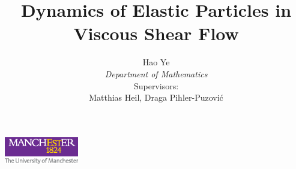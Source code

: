 \documentclass{beamer}
\title{\fontsize{14pt}{12pt}\selectfont Dynamics of Elastic Particles in Viscous Shear Flow}
\author{
	Hao Ye \\ \textit{Department of Mathematics} \\
	\vspace{0.5cm} 
	Supervisors: \\Matthias Heil, Draga Pihler-Puzović
}
\begin{document}
\begin{frame}[plain] 
	\maketitle 
	
	
	\begin{center}
		\includegraphics[height=1.2cm]{plots/TAB_col_white_background.eps} 
	\end{center}
\end{frame}



\end{document}
